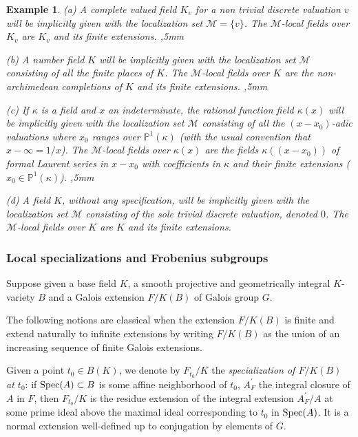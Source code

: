 \documentclass[12pt,english]{amsart}
\newtheorem{twisting lemma}[theorem]{Twisting lemma}
\newtheorem{example}[theorem]{Example}
\begin{document}
\begin{example}
(a) A {\it complete valued field} $K_v$ for a non trivial discrete valuation $v$ will be implicitly given with the  localization set ${\mathcal M}=\{ v\}$. The ${\mathcal M}$-local fields over $K_v$ are $K_v$ and its finite extensions. 
,5mm

\noindent
(b) A {\it number field} $K$ will be implicitly given with the  localization set ${\mathcal M}$ consisting of all the finite places of $K$. The ${\mathcal M}$-local fields over $K$ are the non-archimedean completions of $K$ and its finite extensions. 
,5mm

\noindent
(c) If $\kappa$ is a field and $x$ an indeterminate, the {\it rational function field} $\kappa (x)$ will be implicitly given with the localization set ${\mathcal M}$ consisting of all the $(x-x_0)$-adic valuations where $x_0$ ranges over ${\mathbb{P}}^1(\kappa)$ (with the usual convention that $x-\infty = 1/x$). The ${\mathcal M}$-local fields over $\kappa(x)$ are the fields $\kappa((x-x_0))$ of formal Laurent series in $x-x_0$ with coefficients in $\kappa$ and their finite extensions ($x_0\in {\mathbb{P}}^1(\kappa)$).
,5mm

\noindent
(d) A {\it field} $K$, without any specification, will be implicitly given with the localization set ${\mathcal M}$ consisting of the sole trivial discrete valuation, denoted $0$.  The ${\mathcal M}$-local fields over $K$ are $K$ and its finite extensions. 
\end{example}

\subsubsection{Local specializations and Frobenius subgroups} \label{ssec:globaldata}
Suppose given a base field $K$, a smooth projective and geometrically integral $K$-variety $B$ 
and a Galois extension $F/K(B)$ 
of  Galois group $G$.

The following notions are classical when the extension $F/K(B)$ is finite and extend naturally to infinite extensions by writing $F/K(B)$ as the union of an increasing sequence of finite Galois extensions.

Given a point 
$t_0\in B(K)$, we denote by $F_{t_0}/K$ the {\it specialization of $F/K(B)$ 
at $t_0$}: if ${\rm Spec}(A) \subset B$ is some affine neighborhood of $t_0$, $A^\prime_F$ the integral closure of $A$ in $F$, then $F_{t_0}/K$ is the residue extension of the integral extension $A^\prime_F/A$ at some prime ideal above the maximal ideal corresponding to $t_0$ in ${\rm Spec}(A)$. It is a normal extension well-defined up to conjugation by elements of $G$. 
\end{document}
